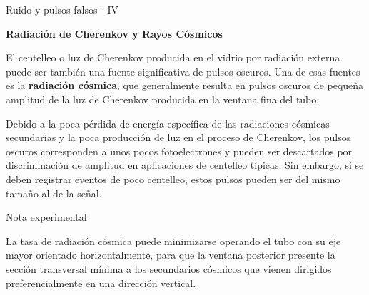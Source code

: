 \documentclass[a4paper,10pt]{beamer}
\begin{document}
\begin{frame}{Ruido y pulsos falsos - IV}
 
  {\Large{\textbf{\color{blue}Radiación de Cherenkov y Rayos Cósmicos}}}

 \begin{justify} 
 
 El centelleo o luz de Cherenkov producida en el vidrio por radiación externa puede 
 ser también una fuente significativa de pulsos oscuros. Una de esas fuentes es la 
 \textbf{radiación cósmica}, que generalmente resulta en pulsos oscuros de pequeña amplitud 
 de la luz de Cherenkov producida en la ventana fina del tubo.
 
 \vspace{.3cm}
 
 Debido a la poca pérdida de energía específica de las radiaciones cósmicas 
 secundarias y la poca producción de luz en el proceso de Cherenkov, los pulsos 
 oscuros corresponden a unos pocos fotoelectrones y pueden ser descartados 
 por discriminación de amplitud en aplicaciones de centelleo típicas. Sin embargo,
  si se deben registrar eventos de poco centelleo, estos pulsos pueden ser 
  del mismo tamaño al de la señal.
  
  \begin{exampleblock}{Nota experimental}
  \begin{justify}
  La tasa de radiación cósmica puede minimizarse operando el tubo con su eje 
  mayor orientado horizontalmente, para que la ventana posterior presente la
  sección transversal mínima a los secundarios cósmicos que vienen dirigidos 
  preferencialmente en una dirección vertical.
  \end{justify} 
  \end{exampleblock}
 
\end{justify} 
\end{frame}
\end{document}

